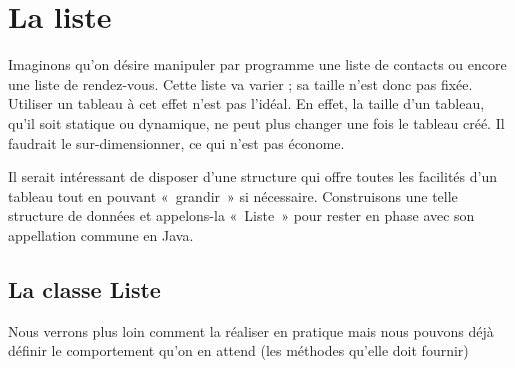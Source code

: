 \chapter{La liste}



Imaginons qu’on désire manipuler par programme une liste de contacts ou
encore une liste de rendez-vous. Cette liste va varier ; sa taille
n’est donc pas fixée. Utiliser un tableau à cet effet n’est pas
l’idéal. En effet, la taille d’un tableau, qu’il soit statique ou
dynamique, ne peut plus changer une fois le tableau créé. Il faudrait
le sur-dimensionner, ce qui n’est pas économe.

Il serait intéressant de disposer d’une structure qui offre toutes les
facilités d’un tableau tout en pouvant «~grandir~» si nécessaire.
Construisons une telle structure de données et appelons-la «~Liste~»
pour rester en phase avec son appellation commune en Java.


\section{La classe Liste}

Nous verrons plus loin comment la réaliser en pratique mais nous pouvons
déjà définir le comportement qu’on en attend (les méthodes qu’elle doit
fournir)


